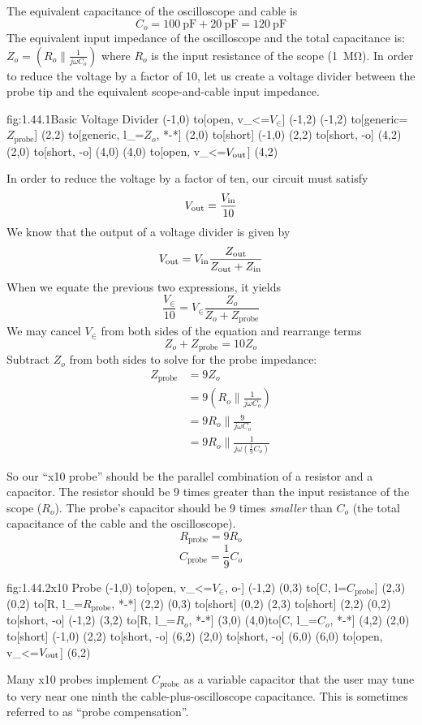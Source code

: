 The equivalent capacitance of the oscilloscope and cable is
\[ C_o = \SI{100}{\pico\farad} + \SI{20}{\pico\farad} =  \SI{120}{\pico\farad}\]
The equivalent input impedance of the oscilloscope and the total capacitance is:
$Z_o = \left( R_o \parallel \frac{1}{j\omega C_o} \right)$
where $R_o$ is the input resistance of the scope (\SI{1}{\mega\ohm}).
In order to reduce the voltage by a factor of 10, let us create a voltage divider between the probe tip and the equivalent scope-and-cable input impedance.
\begin{circuit}{fig:1.44.1}{Basic Voltage Divider}
    (-1,0) to[open, v_<=$V_\in$] (-1,2)
    (-1,2) to[generic=$Z_{\text{probe}}$] (2,2)
    to[generic, l_=$Z_o$, *-*] (2,0)
    to[short] (-1,0)
    (2,2)  to[short, -o] (4,2)
    (2,0) to[short, -o] (4,0)
    (4,0) to[open, v_<=$V_{\text{out}}$] (4,2)
\end{circuit}
In order to reduce the voltage by a factor of ten, our circuit must satisfy
\[V_{\text{out}} = \frac{V_{\text{in}}}{10}\]
We know that the output of a voltage divider is given by
\[V_{\text{out}} = V_{\text{in}}\frac{Z_{\text{out}}}{Z_{\text{out}} + Z_{\text{in}}}\]
When we equate the previous two expressions, it yields
\[\frac{V_{\in}}{10} = V_{\in}\frac{Z_o}{Z_o + Z_{\text{probe}}}\]
We may cancel $V_{\in}$ from both sides of the equation and rearrange terms
\[Z_o + Z_{\text{probe}} = 10 Z_o\]
Subtract $Z_o$ from both sides to solve for the probe impedance:
\begin{align*}
    Z_{\text{probe}} &= 9 Z_o \\
    &= 9 \left( R_o \parallel \frac{1}{ j\omega C_o } \right) \\
    &= 9 R_o \parallel \frac{9}{ j\omega C_o } \\
    &= 9 R_o \parallel \frac{1}{ j\omega \left( \frac{1}{9} C_o \right) }
\end{align*}

So our ``x10 probe'' should be the parallel combination of a resistor and a capacitor.  The resistor should be 9 times greater than the input resistance of the scope ($R_o$).  The probe's capacitor should be 9 times \textit{smaller} than $C_o$ (the total capacitance of the cable and the oscilloscope).
\[R_{\text{probe}} = 9 R_o\]
\[C_{\text{probe}} = \frac{1}{9} C_o\]
\begin{circuit}{fig:1.44.2}{x10 Probe}
    (-1,0) to[open, v_<=$V_\in$, o-] (-1,2)
    (0,3) to[C, l=$C_{\text{probe}}$] (2,3)
    (0,2) to[R, l_=$R_{\text{probe}}$, *-*] (2,2)
    (0,3) to[short] (0,2)
    (2,3) to[short] (2,2)
    (0,2)  to[short, -o] (-1,2)
    (3,2) to[R, l_=$R_o$, *-*] (3,0)
    (4,0)to[C, l_=$C_o$, *-*] (4,2)
    (2,0) to[short] (-1,0)
    (2,2)  to[short, -o] (6,2)
    (2,0) to[short, -o] (6,0)
    (6,0) to[open, v_<=$V_{\text{out}}$] (6,2)
\end{circuit}
Many x10 probes implement $C_{\text{probe}}$ as a variable capacitor that the user may tune to very near one ninth the cable-plus-oscilloscope capacitance.  This is sometimes referred to as ``probe compensation''.

